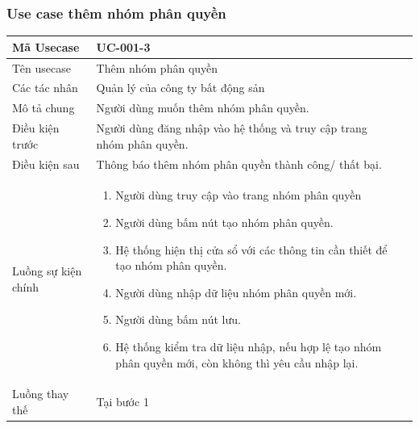 \documentclass[12pt,a4paper]{article}
\begin{document}
    \subsubsection*{Use case thêm nhóm phân quyền }
    \begin{table}[H]
        \centering
        \begin{tabular}{|p{3.5cm}|p{11.5cm}|c|}
            \hline
            Mã Usecase      & UC-001-3                                                             \\
            \hline
            Tên usecase     & Thêm nhóm phân quyền                                                 \\
            \hline
            Các tác nhân    & Quản lý của công ty bất động sản                                     \\
            \hline
            Mô tả chung     & Người dùng muốn thêm nhóm phân quyền.                                \\
            \hline
            Điều kiện trước & Người dùng đăng nhập vào hệ thống và truy cập trang nhóm phân quyền. \\
            \hline
            Điều kiện sau   & Thông báo thêm nhóm phân quyền thành công/ thất bại.                 \\
            \hline
            Luồng sự kiện chính & \vspace{-.8cm}\begin{enumerate}
                                                    \item Người dùng truy cập vào trang nhóm phân quyền
                                                    \item  Người dùng bấm nút tạo nhóm phân quyền.
                                                    \item  Hệ thống hiện thị cửa sổ với các thông tin cần thiết để tạo nhóm phân quyền.
                                                    \item  Người dùng nhập dữ liệu nhóm phân quyền mới.
                                                    \item Người dùng bấm nút lưu.
                                                    \item Hệ thống kiểm tra dữ liệu nhập, nếu hợp lệ tạo nhóm phân quyền mới, còn không thì yêu cầu nhập lại.
            \end{enumerate}
            \\
            \hline
            Luồng thay thế & Tại bước 1\newline

\end{tabular}
\end{table}
\end{document}
